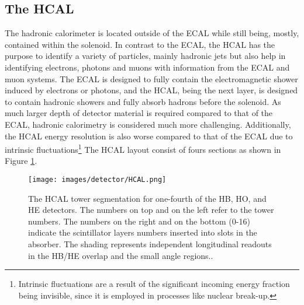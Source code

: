 \subsection{The HCAL}
The hadronic calorimeter is located outside of the ECAL while still being, mostly, contained within the solenoid.
In contrast to the ECAL, the HCAL has the purpose to identify a variety of particles, mainly hadronic jets but also help in identifying electrons, photons and muons with information from the ECAL and muon systems. 
The ECAL is designed to fully contain the electromagnetic shower induced by electrons or photons, and the HCAL, being the next layer, is designed to contain hadronic showers and fully absorb hadrons before the solenoid. 
As much larger depth of detector material is required compared to that of the ECAL, hadronic calorimetry is considered much more challenging. 
Additionally, the HCAL energy resolution is also worse compared to that of the ECAL due to intrinsic fluctuations\footnote{Intrinsic fluctuations are a result of the significant incoming energy fraction being invisible, since it is employed in processes like nuclear break-up.}
The HCAL layout consist of fours sections as shown in Figure \ref{fig:HCAL}. 
\begin{figure}[!htp]
  \centering
   \texttt{[image: images/detector/HCAL.png]}
   \caption{The HCAL tower segmentation for one-fourth of the HB, HO, and HE detectors. The numbers on top and on the left refer to the tower numbers. The numbers on the right and on the bottom (0-16) indicate the scintillator layers numbers inserted into slots in the absorber. The shading represents independent longitudinal readouts in the HB/HE overlap and the small angle regions.\cite{Baiatian:2007xva}.}
   \label{fig:HCAL}
\end{figure}                                                                                            

